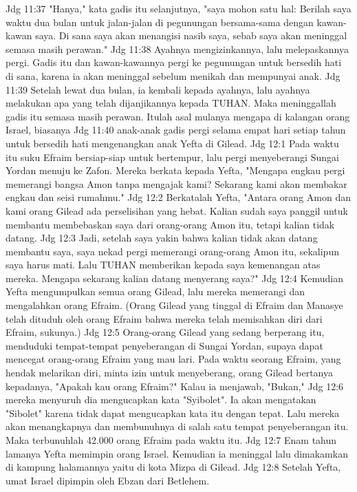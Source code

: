 Jdg 11:37  "Hanya," kata gadis itu selanjutnya, "saya mohon satu hal: Berilah saya waktu dua bulan untuk jalan-jalan di pegunungan bersama-sama dengan kawan-kawan saya. Di sana saya akan menangisi nasib saya, sebab saya akan meninggal semasa masih perawan."
Jdg 11:38  Ayahnya mengizinkannya, lalu melepaskannya pergi. Gadis itu dan kawan-kawannya pergi ke pegunungan untuk bersedih hati di sana, karena ia akan meninggal sebelum menikah dan mempunyai anak.
Jdg 11:39  Setelah lewat dua bulan, ia kembali kepada ayahnya, lalu ayahnya melakukan apa yang telah dijanjikannya kepada TUHAN. Maka meninggallah gadis itu semasa masih perawan. Itulah asal mulanya mengapa di kalangan orang Israel, biasanya
Jdg 11:40  anak-anak gadis pergi selama empat hari setiap tahun untuk bersedih hati mengenangkan anak Yefta di Gilead.
Jdg 12:1  Pada waktu itu suku Efraim bersiap-siap untuk bertempur, lalu pergi menyeberangi Sungai Yordan menuju ke Zafon. Mereka berkata kepada Yefta, "Mengapa engkau pergi memerangi bangsa Amon tanpa mengajak kami? Sekarang kami akan membakar engkau dan seisi rumahmu."
Jdg 12:2  Berkatalah Yefta, "Antara orang Amon dan kami orang Gilead ada perselisihan yang hebat. Kalian sudah saya panggil untuk membantu membebaskan saya dari orang-orang Amon itu, tetapi kalian tidak datang.
Jdg 12:3  Jadi, setelah saya yakin bahwa kalian tidak akan datang membantu saya, saya nekad pergi memerangi orang-orang Amon itu, sekalipun saya harus mati. Lalu TUHAN memberikan kepada saya kemenangan atas mereka. Mengapa sekarang kalian datang menyerang saya?"
Jdg 12:4  Kemudian Yefta mengumpulkan semua orang Gilead, lalu mereka memerangi dan mengalahkan orang Efraim. (Orang Gilead yang tinggal di Efraim dan Manasye telah dituduh oleh orang Efraim bahwa mereka telah memisahkan diri dari Efraim, sukunya.)
Jdg 12:5  Orang-orang Gilead yang sedang berperang itu, menduduki tempat-tempat penyeberangan di Sungai Yordan, supaya dapat mencegat orang-orang Efraim yang mau lari. Pada waktu seorang Efraim, yang hendak melarikan diri, minta izin untuk menyeberang, orang Gilead bertanya kepadanya, "Apakah kau orang Efraim?" Kalau ia menjawab, "Bukan,"
Jdg 12:6  mereka menyuruh dia mengucapkan kata "Syibolet". Ia akan mengatakan "Sibolet" karena tidak dapat mengucapkan kata itu dengan tepat. Lalu mereka akan menangkapnya dan membunuhnya di salah satu tempat penyeberangan itu. Maka terbunuhlah 42.000 orang Efraim pada waktu itu.
Jdg 12:7  Enam tahun lamanya Yefta memimpin orang Israel. Kemudian ia meninggal lalu dimakamkan di kampung halamannya yaitu di kota Mizpa di Gilead.
Jdg 12:8  Setelah Yefta, umat Israel dipimpin oleh Ebzan dari Betlehem.
